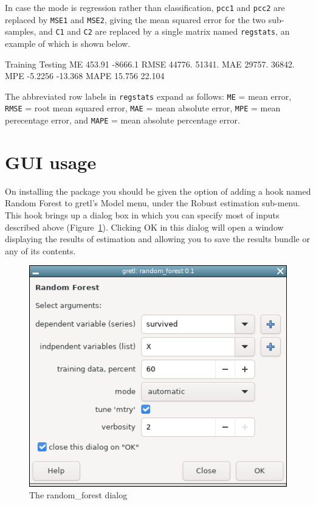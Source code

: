 \documentclass{article}
\begin{document}
In case the mode is regression rather than classification,
\texttt{pcc1} and \texttt{pcc2} are replaced by \texttt{MSE1} and
\texttt{MSE2}, giving the mean squared error for the two sub-samples,
and \texttt{C1} and \texttt{C2} are replaced by a single matrix named
\texttt{regstats}, an example of which is shown below.
%
\begin{code}
         Training      Testing 
  ME       453.91      -8666.1 
RMSE       44776.       51341. 
 MAE       29757.       36842. 
 MPE      -5.2256      -13.368 
MAPE       15.756       22.104
\end{code}
%
The abbreviated row labels in \texttt{regstats} expand as follows:
\texttt{ME} = mean error, \texttt{RMSE} = root mean squared error,
\texttt{MAE} = mean absolute error, \texttt{MPE} = mean perecentage
error, and \texttt{MAPE} = mean absolute percentage error.


\section{GUI usage}

On installing the package you should be given the option of adding a
hook named \textsf{Random Forest} to gretl's \textsf{Model} menu,
under the \textsf{Robust estimation} sub-menu. This hook brings up a
dialog box in which you can specify most of inputs described above
(Figure~\ref{fig:dialog}). Clicking \textsf{OK} in this dialog will
open a window displaying the results of estimation and allowing you to
save the results bundle or any of its contents.

\begin{figure}[htbp]
  \centering
  \includegraphics[scale=0.6]{rfgui.png}
  \caption{The random\_forest dialog}
  \label{fig:dialog}
\end{figure}
\end{document}
